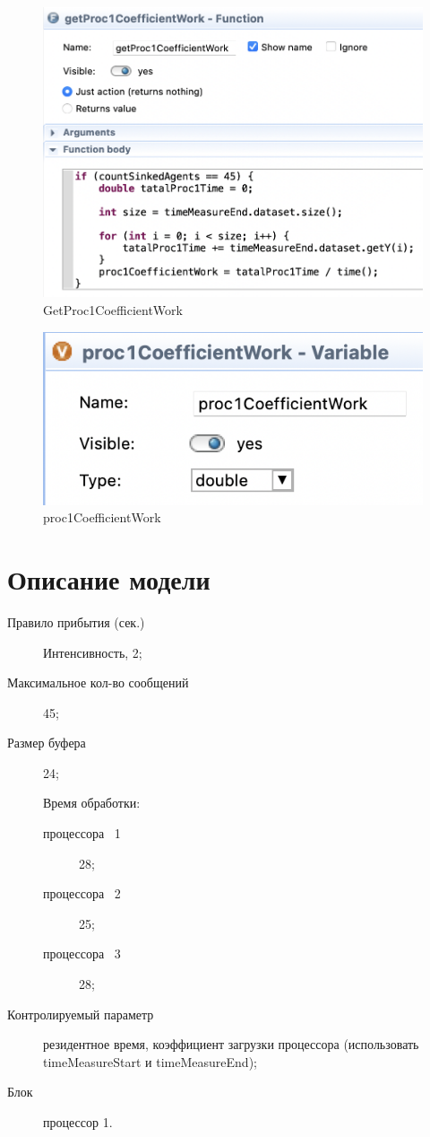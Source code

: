 \documentclass[14pt, a4paper, titlepage]{extarticle}
\begin{document}
	\begin{figure}[H]
		\centering
		\includegraphics[width=.9\textwidth]{getProc1CoefficientWork}
		\caption{GetProc1CoefficientWork}
	\end{figure}

	\begin{figure}[H]
		\centering
		\includegraphics[width=.9\textwidth]{proc1CoefficientWork}
		\caption{proc1CoefficientWork}
	\end{figure}
	
	\section{Описание модели}
	
	\begin{description}
		\item[Правило прибытия (сек.)] Интенсивность, 2;
		\item[Максимальное кол-во сообщений] 45;
		\item[Размер буфера] 24;
		\item[] Время обработки:
		\begin{description}
			\item[процессора \textnumero~1] 28;
			\item[процессора \textnumero~2] 25;
			\item[процессора \textnumero~3] 28;
			
		\end{description}
		\item[Контролируемый параметр] резидентное время, коэффициент загрузки процессора (использовать timeMeasureStart и timeMeasureEnd);
		\item[Блок] процессор 1.
	\end{description}
	
\end{document}
